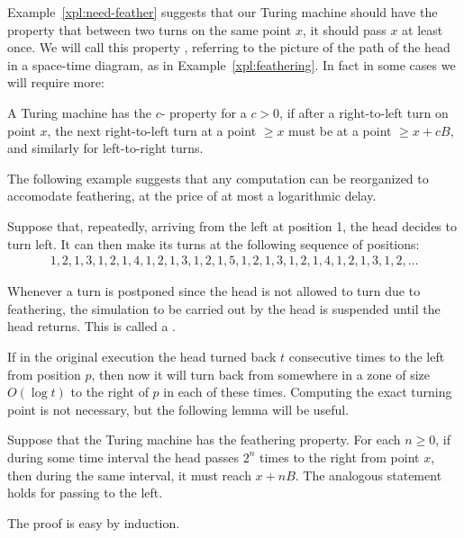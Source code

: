 \documentclass[11pt]{memoir}
\theoremstyle{definition} %
\renewcommand{\ge}{\geq}
\def\B{B}
\begin{document}
Example~\ref{xpl:need-feather} suggests that our Turing machine
should have the property that between two turns
on the same point \( x \), it should pass \( x \) at least once.
We will call this property ,
referring to the picture of the path of the head in a space-time diagram, as
in Example~\ref{xpl:feathering}.
In fact in some cases we will require more:

\begin{definition}\label{def:feathering}
  A Turing machine has the \( c \)- property for a \( c>0 \), if  after
a right-to-left turn on point \( x \), the next right-to-left turn at a point \( \ge x \)
must be at a point \( \ge x + c\B \), and similarly for left-to-right turns.  
\end{definition}

 The following example suggests that any computation can be reorganized to accomodate feathering,
 at the price of at most a logarithmic delay.

\begin{example}\label{xpl:feathering}
Suppose that, repeatedly, arriving from the left at position 1, the head decides to turn left.
It can then make its turns at the following sequence of positions:
\begin{align*}
 1, 2, 1, 3, 1, 2, 1, 4, 1, 2, 1, 3, 1, 2, 1, 5, 1, 2, 1, 3, 1, 2, 1, 4, 1, 2, 1, 3, 1, 2, \dots
 \end{align*}
\end{example}

\begin{definition}[Digression]\label{def:digression}
Whenever a turn is postponed since the head is not allowed to turn due to feathering,
the simulation to be carried out by the head is suspended until the head returns.
This is called a .
\end{definition}

If in the original execution the head turned back \( t \) consecutive
times to the left from position \( p \), then now it will 
turn back from somewhere in a zone of size \( O(\log t) \) to the right of \( p \) in 
each of these times.
Computing the exact turning point is not necessary, but the following lemma
will be useful.

\begin{lemma}\label{lem:feathering-lb}
  Suppose that the Turing machine has the feathering property.
  For each \( n\ge 0 \), if during some time interval the head passes \( 2^{n} \) times to
  the right from point \( x \), then during the same interval, it must reach \( x+n\B \).
  The analogous statement holds for passing to the left.
\end{lemma}
The proof is easy by induction.
\end{document}
